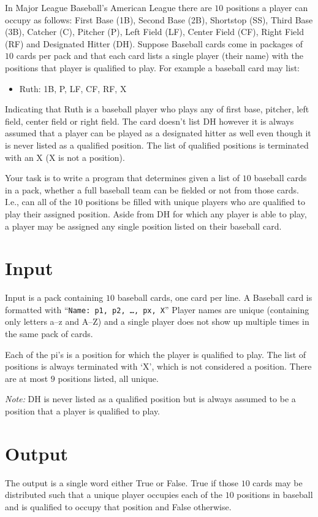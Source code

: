 
In Major League Baseball's American League there are $10$ positions a player can occupy as follows: First Base (1B), Second Base (2B), Shortstop (SS), Third Base (3B), Catcher (C), Pitcher (P), Left Field (LF), Center Field (CF), Right Field (RF) and Designated Hitter (DH). Suppose Baseball cards come in packages of $10$ cards per pack and that each card lists a single player (their name) with the positions that player is qualified to play. For example a baseball card may list:
\begin{itemize}
\item Ruth: 1B, P, LF, CF, RF, X
\end{itemize}
Indicating that Ruth is a baseball player who plays any of first base, pitcher, left field, center field or right field. The card doesn't list DH however it is always assumed that a player can be played as a designated hitter as well even though it is never listed as a qualified position. The list of qualified positions is terminated with an X (X is not a position).

Your task is to write a program that determines given a list of $10$ baseball cards in a pack, whether a full baseball team can be fielded or not from those cards. I.e., can all of the $10$ positions be filled with unique players who are qualified to play their assigned position. Aside from DH for which any player is able to play, a player may be assigned any single position listed on their baseball card.

\section*{Input}
Input is a pack containing $10$ baseball cards, one card per line. A
Baseball card is formatted with ``\texttt{Name: p1, p2, \ldots, px, X}'' 
Player names are unique (containing only letters a--z and A--Z) and a single player 
does not show up multiple times in the same pack of cards.

Each of the pi's is a position for which the player is qualified to play.
The list of positions is always terminated with `X', which is not considered a position.
There are at most $9$ positions listed, all unique.

\emph{Note:} DH is never listed as a qualified position but is always assumed to be a position that a player is qualified to play.

\section*{Output}
The output is a single word either True or False. True if those $10$ cards may be distributed such that a unique player occupies each of the $10$ positions in baseball and is qualified to occupy that position and False otherwise.

